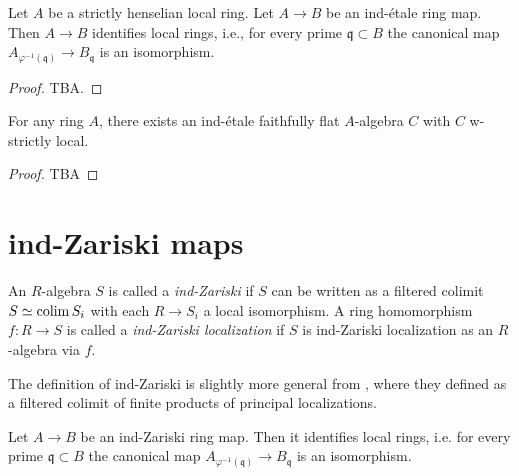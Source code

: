 \begin{lemma}
  \label{thm:ind-etale-strictly-henselian-identifies-local-rings}
  Let \(A\) be a strictly henselian local ring. Let \(A \to B\) be an ind-étale ring map. Then \(A \to B\) identifies local rings, i.e., for every prime \(\mathfrak{q} \subset B\) the canonical map \(A_{\varphi^{-1}(\mathfrak{q})} \to B_{\mathfrak{q}}\) is an isomorphism.
\end{lemma}

\begin{proof}
  TBA.
\end{proof}

\begin{proposition}
  For any ring \(A\), there exists an ind-étale faithfully flat \(A\)-algebra \(C\) with \(C\) w-strictly local.
  \label{thm:ind-etale-w-strictly-local-cover}
\end{proposition}

\begin{proof}
  TBA
\end{proof}

\section{ind-Zariski maps}

\begin{definition}
    \label{def:ind-Zariski}

    An $R$-algebra $S$ is called a \emph{ind-Zariski} if $S$ can be written as a filtered colimit $S \simeq \operatorname{colim} S_i$ with each $R \to S_i$ a local isomorphism. A ring homomorphism $f : R \to S$ is called a \emph{ind-Zariski localization} if $S$ is ind-Zariski localization as an $R$-algebra via $f$.

\end{definition}

\begin{remark}
  The definition of ind-Zariski is slightly more general from \cite[Definition 2.2.1(iv)]{proetale}, where they defined as a filtered colimit of finite products of principal localizations. 
\end{remark}

\begin{lemma}
  Let $A \to B$ be an ind-Zariski ring map. Then it identifies local rings, i.e. for every prime $\mathfrak{q} \subset B$ the canonical map $A_{\varphi^{-1}(\mathfrak{q})} \to B_{\mathfrak{q}}$ is an isomorphism.
  \label{thm:ind-Zariski-identifies-local-rings}
\end{lemma}

